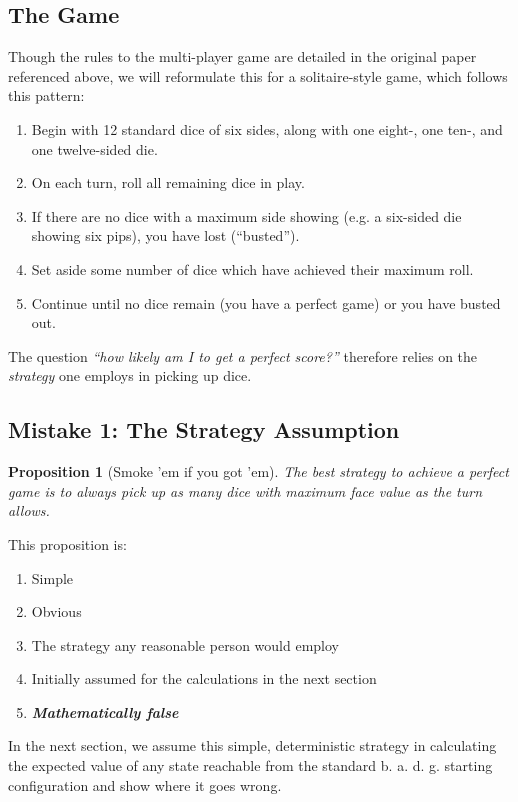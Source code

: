 \documentclass[11pt, oneside]{article} 	%
\newtheorem{proposition}[theorem]{Proposition}
\begin{document}
\subsection{The Game}

Though the rules to the multi-player game are detailed in the original paper referenced above, we will reformulate this for a solitaire-style game, which follows this pattern:
\begin{enumerate}
\item Begin with 12 standard dice of six sides, along with one eight-, one ten-, and one twelve-sided die.
\item On each turn, roll all remaining dice in play.
\item If there are no dice with a maximum side showing (e.g. a six-sided die showing six pips), you have lost (``busted'').
\item Set aside some number of dice which have achieved their maximum roll.
\item Continue until no dice remain (you have a perfect game) or you have busted out.
\end{enumerate}

The question \textit{``how likely am I to get a perfect score?''} therefore relies on the \textit{strategy} one employs in picking up dice.  

\subsection{Mistake 1: The Strategy Assumption}
\begin{proposition}[Smoke 'em if you got 'em] The best strategy to achieve a perfect game is to always pick up as many dice with maximum face value as the turn allows.\end{proposition}

This proposition is:
\begin{enumerate}
\item Simple
\item Obvious
\item The strategy any reasonable person would employ
\item Initially assumed for the calculations in the next section
\item \textbf{\textit{Mathematically false}}
\end{enumerate}

In the next section, we assume this simple, deterministic strategy in calculating the expected value of any state reachable from the standard b. a. d. g. starting configuration and show where it goes wrong.
\end{document}
